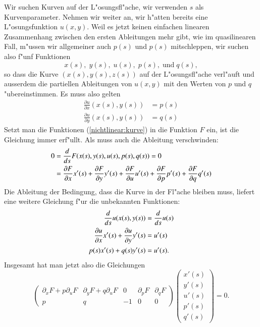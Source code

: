 Wir suchen Kurven auf der L"osungsfl"ache, wir verwenden $s$ als
Kurvenparameter.
Nehmen wir weiter an, wir h"atten bereits eine L"osungsfunktion $u(x,y)$.
Weil es jetzt keinen
einfachen linearen Zusammenhang zwischen den ersten Ableitungen
mehr gibt, wie im quasilinearen Fall, m"ussen wir allgemeiner
auch $p(s)$ und $p(s)$ mitschleppen, wir suchen also f"unf
Funktionen
\begin{equation}
x(s),\;
y(s),\; 
u(s),\; 
p(s),\; 
\text{und}\;
q(s),
\label{nichtlinear:kurve}
\end{equation}
so dass die Kurve $(x(s),y(s),z(s))$ auf der L"osungsfl"ache
verl"auft und ausserdem die partiellen Ableitungen 
von $u(x,y)$ mit den Werten von $p$ und $q$ "ubereinstimmen.
Es muss also gelten
\begin{align*}
\frac{\partial u}{\partial x}(x(s), y(s))&=p(s)\\
\frac{\partial u}{\partial y}(x(s), y(s))&=q(s)
\end{align*}
Setzt man die Funktionen (\ref{nichtlinear:kurve}) in die Funktion
$F$ ein, ist die Gleichung immer erf"ullt. Als muss auch die Ableitung
verschwinden:
\begin{align}
0
&=
\frac{d}{ds}F(x(s),y(s),u(s),p(s),q(s))=0
\notag
\\
&=
\frac{\partial F}{\partial x}x'(s)
+
\frac{\partial F}{\partial y}y'(s)
+
\frac{\partial F}{\partial u}u'(s)
+
\frac{\partial F}{\partial p}p'(s)
+
\frac{\partial F}{\partial q}q'(s)
\label{nichtlinear:totale}
\end{align}
Die Ableitung der Bedingung, dass die Kurve in der Fl"ache bleiben muss,
liefert eine weitere Gleichung f"ur die unbekannten Funktionen:
\begin{align}
\frac{d}{ds}u(x(s),y(s))&=\frac{d}{ds}u(s)
\notag
\\
\frac{\partial u}{\partial x}x'(s)
+
\frac{\partial u}{\partial y}y'(s)
&=
u'(s)
\notag
\\
p(s)x'(s)+q(s)y'(s)
&=
u'(s).
\label{nichtlinear:flaeche}
\end{align}
Insgesamt hat man jetzt also die Gleichungen
\begin{equation}
\begin{pmatrix}
\partial_x F+p\partial_uF& \partial_y F+q\partial_uF&0&\partial_pF&\partial_qF\\
p&q&-1&0&0
\end{pmatrix}
\begin{pmatrix}
x'(s)\\
y'(s)\\
u'(s)\\
p'(s)\\
q'(s)
\end{pmatrix}=0.
\label{nichtlinear:gleichungen}
\end{equation}
